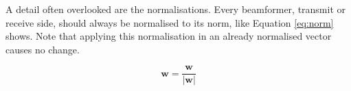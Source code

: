 A detail often overlooked are the normalisations. Every beamformer, transmit or receive side, should always be normalised to its norm, like Equation \eqref{eq:norm} shows. Note that applying this normalisation in an already normalised vector causes no change.

\begin{equation} \label{eq:norm}
    \bm{w} = \frac{\bm{w}}{\left|\bm{w}\right|}
\end{equation}


\begin{comment}

If MRC is applied when receiving, exactly with the same formula as when transmitting, Equation \eqref{eq:rx_pow} simplifies to Equation \eqref{eq:rx_pow2}. But this is not correct.


\begin{equation} \label{eq:rx_pow2}
    P_r = P_0 \left| \bm{w}_t^\text{T} \bm{H}  \frac{\ \left(\bm{w}_t^\text{T} \bm{H}\right)^H}{\left| \bm{w}_t^\text{T} \bm{H}\right|}\right|^2 = P_0 \left| \bm{w}_t^\text{T} \bm{H}\right|^2
\end{equation}

But this formula does not does not provide the real received power, only something proportional to it, normalised to the number of receive antennas. This common mistake happens due to normalisations. We present the correct formula for the absolute power at the end of this section.

\subsection*{Correction with normalisations}
Notably, observe how normalisations for transmission and reception beamformers should differ. For the transmission, we need to normalise the weight vector to have unitary norm because all the power contributions come from the total transmit power, which we fully decouple from the precoding step. Mathematically, the following (in Equation \eqref{eq:t_norm}) should not alter the value of the precoder. 

\begin{equation} \label{eq:t_norm}
    \bm{w}_t = \frac{\bm{w}_t}{\left|\bm{w}_t\right|}
\end{equation}

For the reception however, the weights' normalisation should be such that no power scaling per antenna element takes place. If $|w_i| = 1$ then the amplitude of the signal coming from that antenna will not be scaled, and hence the power also will not be scaled. Depending on the combining strategy, some scaling is desirable in order to prioritise better paths. Thus, instead of imposing no scaling per antenna, we impose a limit on the contribution of all elements $\sum_{i=1}^{N_r} |w_i|^2 = N_r$, or, analogously, taking the square root of both sides, we obtain $\sqrt{\sum_{i=1}^{N_r} |w_i|^2} = |w| = \sqrt{N_r}$. The normalisation present in Equation \eqref{eq:r_norm}.


\end{comment}
